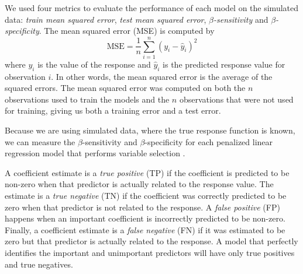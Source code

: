 \documentclass{article}
\begin{document}
	We used four metrics to evaluate the performance of each model on the simulated data: \textit{train mean squared error}, \textit{test mean squared error}, \textit{$\beta$-sensitivity} and \textit{$\beta$-specificity}. The mean squared error (MSE) is computed by
	\begin{equation}
		\text{MSE} = \frac{1}{n}\sum\limits_{i = 1}^n (y_i - \hat{y}_i)^2
	\end{equation}
	where $y_i$ is the value of the response and $\hat{y}_i$ is the predicted response value for observation $i$. In other words, the mean squared error is the average of the squared errors. The mean squared error was computed on both the $n$ observations used to train the models and the $n$ observations that were not used for training, giving us both a training error and a test error.
	
	Because we are using simulated data, where the true response function is known, we can measure the $\beta$-sensitivity and $\beta$-specificity for each penalized linear regression model that performs variable selection \cite{liu2020logsum}. 

	A coefficient estimate is a \textit{true positive} (TP) if the coefficient is predicted to be non-zero when that predictor is actually related to the response value. The estimate is a \textit{true negative} (TN) if the coefficient was correctly predicted to be zero when that predictor is not related to the response. A \textit{false positive} (FP) happens when an important coefficient is incorrectly predicted to be non-zero. Finally, a coefficient estimate is a \textit{false negative} (FN) if it was estimated to be zero but that predictor is actually related to the response. A model that perfectly identifies the important and unimportant predictors will have only true positives and true negatives.
	
\end{document}
